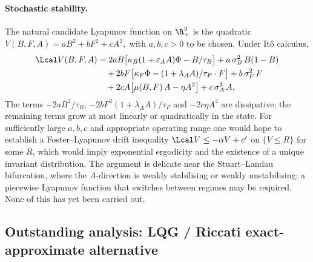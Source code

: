 \paragraph{Stochastic stability.} The natural candidate Lyapunov function
on $\R^3_+$ is the quadratic
\(
  V(B,F,A) = a B^2 + b F^2 + c A^2,
\)
with $a,b,c > 0$ to be chosen. Under It\^o calculus,
\begin{align*}
  \Lcal V(B,F,A)
    &= 2a B \bigl[\kappa_B(1+\varepsilon_A A)\Phi - B/\tau_B\bigr]
       + a\,\sigma_B^2\,B(1-B) \\
    &\quad
       + 2b F \bigl[\kappa_F \Phi - (1+\lambda_A A)/\tau_F \cdot F\bigr]
       + b\,\sigma_F^2\,F \\
    &\quad
       + 2c A \bigl[\mu(B,F)\,A - \eta A^3\bigr]
       + c\,\sigma_A^2\,A.
\end{align*}
The terms $-2a B^2/\tau_B$, $-2b F^2 (1+\lambda_A A)/\tau_F$ and
$-2c \eta A^4$ are dissipative; the remaining terms grow at most
linearly or quadratically in the state. For sufficiently large $a,b,c$
and appropriate operating range one would hope to establish a
Foster--Lyapunov drift inequality $\Lcal V \le -\alpha V + c'$ on
$\{V \le R\}$ for some $R$, which would imply exponential ergodicity and
the existence of a unique invariant distribution. The argument is
delicate near the Stuart--Landau bifurcation, where the $A$-direction is
weakly stabilising or weakly unstabilising; a piecewise Lyapunov function
that switches between regimes may be required. None of this has yet been
carried out.

\subsection{Outstanding analysis: LQG / Riccati exact-approximate
alternative}\label{sec:discussion-lqg}

